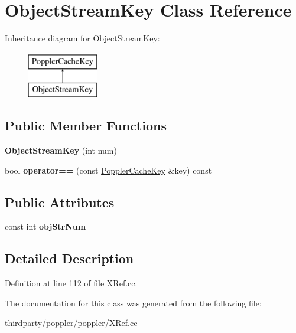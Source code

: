 \hypertarget{class_object_stream_key}{}\section{Object\+Stream\+Key Class Reference}
\label{class_object_stream_key}
Inheritance diagram for Object\+Stream\+Key\+:\begin{figure}[H]
\begin{center}
\leavevmode
\includegraphics[height=2.000000cm]{class_object_stream_key}
\end{center}
\end{figure}
\subsection*{Public Member Functions}
\begin{DoxyCompactItemize}
\item 
\mbox{\label{class_object_stream_key_a280773cf850faede40c963c909bc4162}} 
{\bfseries Object\+Stream\+Key} (int num)
\item 
\mbox{\label{class_object_stream_key_a9802adcd41e9f1724e14ff921cd5bf1a}} 
bool {\bfseries operator==} (const \hyperlink{class_poppler_cache_key}{Poppler\+Cache\+Key} \&key) const
\end{DoxyCompactItemize}
\subsection*{Public Attributes}
\begin{DoxyCompactItemize}
\item 
\mbox{\label{class_object_stream_key_a94c404b497b5ac45ee69599a0cd4c4a9}} 
const int {\bfseries obj\+Str\+Num}
\end{DoxyCompactItemize}


\subsection{Detailed Description}


Definition at line 112 of file X\+Ref.\+cc.



The documentation for this class was generated from the following file\+:\begin{DoxyCompactItemize}
\item 
thirdparty/poppler/poppler/X\+Ref.\+cc\end{DoxyCompactItemize}
